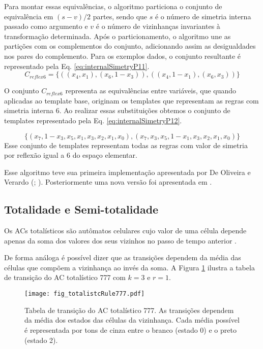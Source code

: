 Para montar essas equivalências, o algoritmo particiona o conjunto de equivalência em $(s-v)/2$ partes, sendo que $s$ é o número de simetria interna passado como argumento e $v$ é o número de vizinhanças invariantes à transformação determinada. Após o particionamento, o algoritmo une as partições com os complementos do conjunto, adicionando assim as desigualdades nos pares do complemento. Para os exemplos dados, o conjunto resultante é representado pela Eq. \eqref{eq:internalSimetryP11}.
\begin{equation}
C_{reflex6}=\{((x_4,x_1),(x_6,1-x_3)),((x_4,1-x_1),(x_6,x_3))\}
\label{eq:internalSimetryP11}
\end{equation}

O conjunto $C_{reflex6}$ representa as equivalências entre variáveis, que quando aplicadas ao template base, originam os templates que representam as regras com simetria interna 6. Ao realizar essas substituições obtemos o conjunto de templates representado pela Eq. \eqref{eq:internalSimetryP12}.

\begin{equation}
\{(x_7,1-x_3,x_5,x_1,x_3,x_2,x_1,x_0),(x_7,x_3,x_5,1-x_1,x_3,x_2,x_1,x_0)\}
\label{eq:internalSimetryP12}
\end{equation}
Esse conjunto de templates representam todas as regras com valor de simetria por reflexão igual a 6 do espaço elementar.

Esse algoritmo teve sua primeira implementação apresentada por De Oliveira e Verardo (\citeyear{deOliveira2014}; \citeyear{deOliveira2014b}). Posteriormente uma nova versão foi apresentada em \cite{Verardo2014}.

\subsection{Totalidade e Semi-totalidade}
Os ACs totalísticos são autômatos celulares cujo valor de uma célula depende apenas da soma dos valores dos seus vizinhos no passo de tempo anterior \cite{wolfram1983statistical}.

De forma análoga é possível dizer que as transições dependem da média das células que compõem  a vizinhança ao invés da soma. A Figura \ref{fig:totalistcRule} ilustra a tabela de transição do AC totalístico 777 com $k = 3$ e $r = 1$. 

	\begin{figure}[h!]
	  \centering
	  \texttt{[image: fig\_totalistcRule777.pdf]}
	  \caption{Tabela de transição do AC totalístico 777. As transições dependem da média dos estados das células da vizinhança. Cada média possível é representada por tons de cinza entre o branco (estado 0) e o preto (estado 2).}
	  \label{fig:totalistcRule}
	\end{figure}


